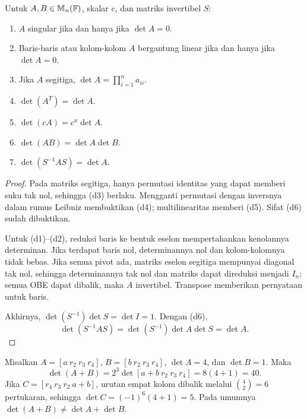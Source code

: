 \begin{prop}
      \label{det:dasar}
      Untuk $A,B\in\mathbb{M}_n(\mathbb{F})$, skalar $c$, dan matriks invertibel $S$:
      \begin{enumerate}[label=(d\arabic*),nosep]
            \item $A$ singular jika dan hanya jika $\det A=0$.
            \item Baris-baris atau kolom-kolom $A$ bergantung linear jika dan
                  hanya jika $\det A=0$.
            \item Jika $A$ segitiga, $\det A=\prod_{i=1}^n a_{ii}$.
            \item $\det(A^T)=\det A$.
            \item $\det(cA)=c^n\det A$.
            \item $\det(AB)=\det A\det B$.
            \item $\det(S^{-1}AS)=\det A$.
      \end{enumerate}
\end{prop}
\begin{proof}
      Pada matriks segitiga, hanya permutasi identitas yang dapat memberi
      suku tak nol, sehingga (d3) berlaku. Mengganti permutasi dengan
      inversnya dalam rumus Leibniz membuktikan (d4); multilinearitas
      memberi (d5). Sifat (d6) sudah dibuktikan.

      Untuk (d1)--(d2), reduksi baris ke bentuk eselon mempertahankan
      kenolannya determinan. Jika terdapat baris nol, determinannya nol
      dan kolom-kolomnya tidak bebas. Jika semua pivot ada, matriks eselon
      segitiga mempunyai diagonal tak nol, sehingga determinannya tak nol
      dan matriks dapat direduksi menjadi $I_n$; semua OBE dapat dibalik,
      maka $A$ invertibel. Transpose memberikan pernyataan untuk baris.

      Akhirnya, $\det(S^{-1})\det S=\det I=1$. Dengan (d6),
      \[
            \det(S^{-1}AS)=\det(S^{-1})\det A\det S=\det A.
      \]
\end{proof}

\begin{exam}
      Misalkan $A=[a\ r_2\ r_3\ r_4]$, $B=[b\ r_2\ r_3\ r_4]$,
      $\det A=4$, dan $\det B=1$. Maka
      \[
            \det(A+B)=2^3\det[a+b\ r_2\ r_3\ r_4]=8(4+1)=40.
      \]
      Jika $C=[r_4\ r_3\ r_2\ a+b]$, urutan empat kolom dibalik melalui
      $\binom42=6$ pertukaran, sehingga $\det C=(-1)^6(4+1)=5$.
      Pada umumnya $\det(A+B)\ne\det A+\det B$.
\end{exam}

